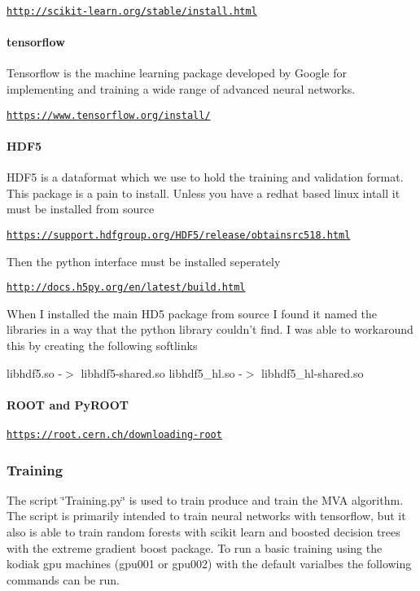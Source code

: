 \href{http://scikit-learn.org/stable/install.html}{\tt http\-://scikit-\/learn.\-org/stable/install.\-html}

\paragraph*{tensorflow}

Tensorflow is the machine learning package developed by Google for implementing and training a wide range of advanced neural networks.

\href{https://www.tensorflow.org/install/}{\tt https\-://www.\-tensorflow.\-org/install/}

\paragraph*{H\-D\-F5}

H\-D\-F5 is a dataformat which we use to hold the training and validation format. This package is a pain to install. Unless you have a redhat based linux intall it must be installed from source

\href{https://support.hdfgroup.org/HDF5/release/obtainsrc518.html}{\tt https\-://support.\-hdfgroup.\-org/\-H\-D\-F5/release/obtainsrc518.\-html}

Then the python interface must be installed seperately

\href{http://docs.h5py.org/en/latest/build.html}{\tt http\-://docs.\-h5py.\-org/en/latest/build.\-html}

When I installed the main H\-D5 package from source I found it named the libraries in a way that the python library couldn't find. I was able to workaround this by creating the following softlinks

libhdf5.\-so -\/$>$ libhdf5-\/shared.\-so libhdf5\-\_\-hl.\-so -\/$>$ libhdf5\-\_\-hl-\/shared.\-so

\paragraph*{R\-O\-O\-T and Py\-R\-O\-O\-T}

\href{https://root.cern.ch/downloading-root}{\tt https\-://root.\-cern.\-ch/downloading-\/root}

\subsubsection*{Training}

The script \char`\"{}\-Training.\-py\char`\"{} is used to train produce and train the M\-V\-A algorithm. The script is primarily intended to train neural networks with tensorflow, but it also is able to train random forests with scikit learn and boosted decision trees with the extreme gradient boost package. To run a basic training using the kodiak gpu machines (gpu001 or gpu002) with the default varialbes the following commands can be run.


